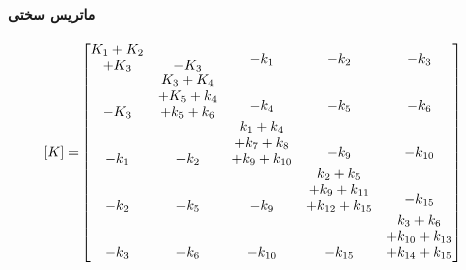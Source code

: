 \paragraph{ماتریس سختی}
\begin{equation}\label{Eq.stiffness_matrix_dimensional_combined}
\begin{aligned}
[K] = &
\begin{bmatrix}
\shortstack{$K_1 + K_2$ \\ $+ K_3$} & -K_3 & \shortstack{$-k_1$ \\ \,} & \shortstack{$-k_2$ \\ \,} & \shortstack{$-k_3$ \\ \,} \\
-K_3 & \shortstack{$K_3 + K_4$ \\ $+ K_5 + k_4$ \\ $+ k_5 + k_6$} & \shortstack{$-k_4$ \\ \,} & \shortstack{$-k_5$ \\ \,} & \shortstack{$-k_6$ \\ \,} \\
-k_1 & -k_2 & \shortstack{$k_1 + k_4$ \\ $+ k_7 + k_8$ \\ $+ k_9 + k_{10}$} & \shortstack{$-k_9$ \\ \,} & \shortstack{$-k_{10}$ \\ \,} \\
-k_2 & -k_5 & -k_9 & \shortstack{$k_2 + k_5$ \\ $+ k_9 + k_{11}$ \\ $+ k_{12} + k_{15}$} & \shortstack{$-k_{15}$ \\ \,} \\
-k_3 & -k_{6} & -k_{10} & -k_{15} & \shortstack{$k_3 + k_6$ \\ $+ k_{10} + k_{13}$ \\ $+ k_{14} + k_{15}$}
\end{bmatrix}
\end{aligned}
\end{equation}

